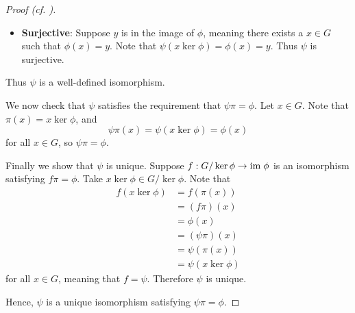 \begin{proof}[Proof (cf. {\cite[p.~250, Theorem 2]{cohn_1982}})]
\begin{itemize}
        \item \textbf{Surjective}: Suppose $y$ is in the image of $\phi$, meaning there exists a $x \in G$ such that $\phi(x) = y$. Note that $\psi(x\ker\phi) = \phi(x) = y$. Thus $\psi$ is surjective.
    \end{itemize}
    Thus $\psi$ is a well-defined isomorphism.

    We now check that $\psi$ satisfies the requirement that $\psi\pi = \phi$. Let $x \in G$. Note that $\pi(x) = x\ker\phi$, and
    \[
        \psi\pi(x) = \psi(x\ker\phi) = \phi(x)
    \]
    for all $x \in G$, so $\psi\pi = \phi$.

    Finally we show that $\psi$ is unique. Suppose $f: G/\ker\phi \to \mathrm{im}\;\phi$ is an isomorphism satisfying $f\pi=\phi$. Take $x\ker\phi \in G/\ker\phi$. Note that
    \begin{align*}
        f(x\ker\phi) &= f(\pi(x))\\
        &= (f\pi)(x)\\
        &= \phi(x)\\
        &= (\psi\pi)(x)\\
        &= \psi(\pi(x))\\
        &= \psi(x\ker\phi)
    \end{align*}
    for all $x \in G$, meaning that $f = \psi$. Therefore $\psi$ is unique.

    Hence, $\psi$ is a unique isomorphism satisfying $\psi\pi = \phi$.
\end{proof}

